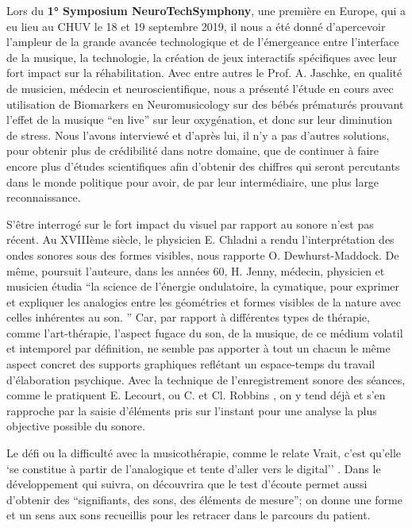  Lors du \textbf{1° Symposium
 NeuroTechSymphony}, une première en Europe, qui a eu lieu au CHUV le 18 et 19 septembre 2019, il nous a été
 donné d'apercevoir l'ampleur de la grande avancée technologique
 et de l'émergeance entre l'interface de la musique, la technologie, la
 création de jeux interactifs spécifiques avec leur fort impact sur la
 réhabilitation. Avec entre autres le Prof. A. Jaschke, en qualité de musicien, médecin et 
 neuroscientifique, nous a  présenté l'étude en cours avec utilisation de
Biomarkers en Neuromusicology sur des
bébés prématurés prouvant l'effet de la musique ``en live'' sur leur
oxygénation, et donc sur leur diminution de stress. Nous l'avons interviewé et d'après lui, il n'y a pas 
d'autres solutions, pour obtenir plus de crédibilité dans notre domaine, que de continuer à faire encore 
plus d'études scientifiques afin d'obtenir des chiffres qui seront percutants dans le monde politique pour 
avoir, de par leur intermédiaire, une plus large reconnaissance.


S'être interrogé sur le fort impact du visuel par rapport au sonore n'est pas récent. Au XVIIIème siècle, le 
physicien E. Chladni a rendu l'interprétation des ondes sonores sous des formes visibles, nous 
rapporte O. Dewhurst-Maddock. De même, poursuit l'auteure, dans les années 60, H. Jenny, 
médecin, physicien et musicien étudia  ``la science de l'énergie ondulatoire, la cymatique, pour exprimer 
et expliquer les analogies entre les géométries et formes visibles de la nature avec celles inhérentes au 
son. ''\autocite [30] {Dewhurst}
Car, par rapport à différentes types de thérapie, comme l'art-thérapie,
l'aspect fugace du son, de la musique, de ce médium volatil et
intemporel par
définition, ne semble pas apporter à tout un chacun le
même aspect concret des supports
graphiques
reflétant un espace-temps du travail d'élaboration
psychique.
Avec la technique de l'enregistrement sonore des séances, comme le pratiquent E.
Lecourt, ou C. et Cl.
Robbins \autocite {lecourt_les_2017}, on y tend déjà et s'en rapproche par la saisie d'éléments pris sur l'instant pour une
analyse la plus objective possible du sonore.


 Le défi ou la difficulté avec la musicothérapie, comme le relate Vrait, 
 c'est qu'elle  `se constitue à partir 
 de l'analogique et tente d'aller vers le digital'' 
 \autocite[24]{vrait_musicotherapie_2018}.
Dans le développement qui suivra, on découvrira que le test d'écoute permet aussi d'obtenir des   
\enquote{signifiants, des sons, des éléments de mesure}; on donne
une forme et un sens aux sons recueillis pour les retracer dans le
parcours du patient.

